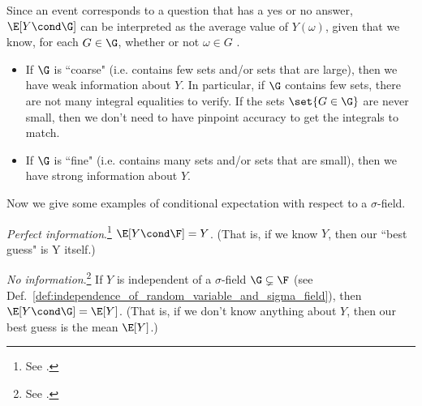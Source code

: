 \documentclass{article} %
\begin{document}
\begin{remark}
Since an event corresponds to a question that has a yes or no answer, $\E[Y \cond \G]$ can be interpreted as the average value of $Y(\omega)$, given that we know, for each $G \in \G$, whether or not $\omega \in G$ \cite[pp.218]{ash2000probability}.  
\begin{itemize}
\item If $\G$ is ``coarse" (i.e. contains few sets and/or sets that are large), then  we have weak information about $Y$.  In particular, if $\G$ contains few sets, there are not many integral equalities to verify. If the sets $\set{G \in \G}$ are never small, then we don't need to have pinpoint accuracy to get the integrals to match. 

\item If $\G$ is ``fine" (i.e. contains many sets and/or sets that are small), then we have strong information about $Y$.
\end{itemize}
\label{rk:fineness_of_sigma_field_gives_information_about_a_random_variable}
\end{remark}


\begin{examples}
Now we give some examples of conditional expectation with respect to a $\sigma$-field.
\begin{alphabate}
\item \textit{Perfect information}.\footnote{See \cite[pp.223]{durrett2010probability}.} $\E[Y \cond \F] =Y$.  (That is, if we know $Y$, then our ``best guess" is Y itself.)
\item \textit{No information}.\footnote{See \cite[pp.223]{durrett2010probability}.} If $Y$ is independent of a $\sigma$-field $\G \subsetneq \F$ (see Def.~\ref{def:independence_of_random_variable_and_sigma_field}), then $\E[Y \cond \G] = \E[Y]$.  (That is, if we don't know anything about $Y$, then our best guess is the mean $\E[Y]$.)
\end{alphabate}
\label{ex:examples_with_conditional_expectation_wrt_sigma_field}
\end{examples}
\end{document}
